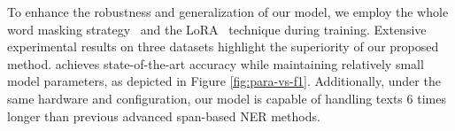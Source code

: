 To enhance the robustness and generalization of our model,
we employ the whole word masking strategy~\cite{cui2021pre}  and the LoRA~\cite{hu2021lora} technique during training.
Extensive experimental results on three datasets highlight the superiority of our proposed method.
\model achieves state-of-the-art accuracy while maintaining relatively small model parameters, as depicted in Figure \ref{fig:para-vs-f1}.
Additionally, under the same hardware and configuration, our model is capable of handling texts $6$ times longer than previous advanced span-based NER methods.
